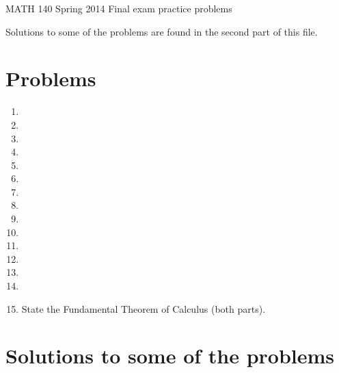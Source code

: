 \documentclass{article}[12pt]
\begin{document}
\begin{center}
MATH 140 Spring 2014 Final exam practice problems 
\end{center}
Solutions to some of the problems are found in the second part of this file.

\section{Problems}
\begin{enumerate}
\item 

\item 
\item 

\item 
\item 
\item 
\item 
\item 
\item 

\item 
\item 
\item 
\item 
\item  
\item State the Fundamental Theorem of Calculus (both parts).
\end{enumerate}
\section{Solutions to some of the problems}












\end{document}

